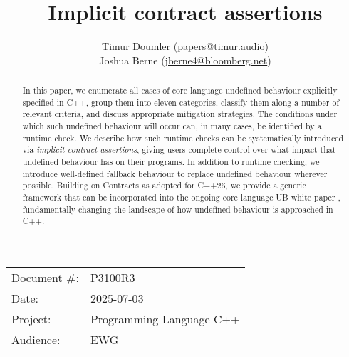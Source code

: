 

\title{Implicit contract assertions}
\author{ Timur Doumler \small(\href{mailto:papers@timur.audio}{papers@timur.audio}) 
\\ Joshua Berne \small(\href{mailto:jberne4@bloomberg.net}{jberne4@bloomberg.net})  
}
\date{}
\maketitle

\begin{tabular}{ll}
Document \#: & P3100R3 \\
Date: &2025-07-03 \\
Project: & Programming Language C++ \\
Audience: & EWG
\end{tabular}

\begin{abstract}
In this paper, we enumerate all cases of core language undefined behaviour explicitly specified in C++,  group them into eleven categories, classify them along a number of relevant criteria, and discuss appropriate mitigation strategies. The conditions under which such undefined behaviour will occur can, in many cases, be identified by a runtime check. We describe how such runtime checks can be systematically introduced via \emph{implicit contract assertions}, giving users complete control over what impact that undefined behaviour has on their programs. In addition to runtime checking, we introduce well-defined fallback behaviour to replace undefined behaviour wherever possible. Building on Contracts as adopted for C++26, we provide a generic framework that can be incorporated into the ongoing core language UB white paper \cite{P3656R1}, fundamentally changing the landscape of how undefined behaviour is approached in C++.
\end{abstract}


\tableofcontents*
\pagebreak




